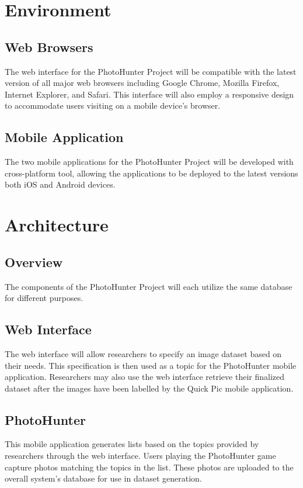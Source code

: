 \documentclass{article}
\begin{document}
\section{Environment}
\subsection{Web Browsers}
The web interface for the PhotoHunter Project will be compatible with the
latest version of all major web browsers including Google Chrome, Mozilla
Firefox, Internet Explorer, and Safari. This interface will also employ a
responsive design to accommodate users visiting on a mobile device's browser.

\subsection{Mobile Application}
The two mobile applications for the PhotoHunter Project will be developed with
cross-platform tool, allowing the applications to be deployed to the latest
versions both iOS and Android devices. 

\section{Architecture}

\subsection{Overview}
The components of the PhotoHunter Project will each utilize the same database
for different purposes.

\subsection{Web Interface}
The web interface will allow researchers to specify an image dataset based on
their needs. This specification is then used as a topic for the PhotoHunter
mobile application. Researchers may also use the web interface retrieve their
finalized dataset after the images have been labelled by the Quick Pic mobile
application. 

\subsection{PhotoHunter}
This mobile application generates lists based on the topics provided by
researchers through the web interface. Users playing the PhotoHunter game
capture photos matching the topics in the list. These photos are uploaded to
the overall system's database for use in dataset generation.
\end{document}
